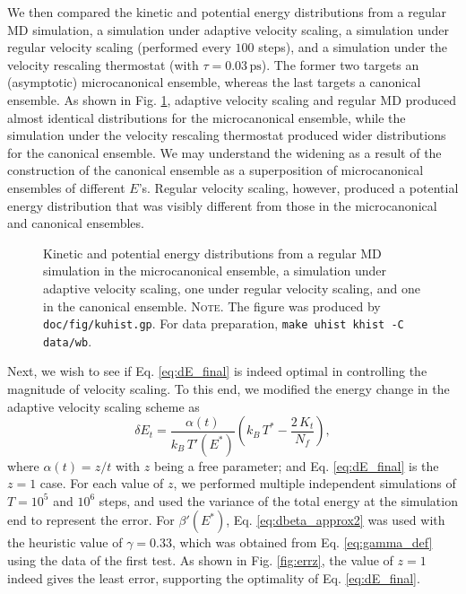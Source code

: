 \documentclass[reprint]{revtex4-1}
\newcommand{\note}[1]{{\color{DarkGreen}\footnotesize \textsc{Note.} #1}}
\begin{document}
We then compared the kinetic and potential energy
distributions from a regular MD simulation,
a simulation under adaptive velocity scaling,
a simulation under regular velocity scaling (performed every $100$ steps),
and
a simulation under the velocity rescaling
thermostat\cite{bussi2007}
(with $\tau = 0.03 \, \mathrm{ps}$).
%
The former two targets an (asymptotic) microcanonical ensemble,
whereas the last targets a canonical ensemble.
%
As shown in Fig. \ref{fig:kuhist},
adaptive velocity scaling and regular MD
produced almost identical distributions for the microcanonical ensemble,
while the simulation under the velocity rescaling thermostat
produced wider distributions for the canonical ensemble.
%
We may understand the widening %
as a result of the construction of the canonical ensemble
as a superposition of microcanonical ensembles of different $E$'s.
%
Regular velocity scaling, however, produced
a potential energy distribution that
was visibly different from
those in the microcanonical and canonical ensembles.
%

\begin{figure}[h]
\begin{center}
  \caption{
    \label{fig:kuhist}
    Kinetic and potential energy distributions
    from a regular MD simulation in the microcanonical ensemble,
    a simulation under adaptive velocity scaling,
    one under regular velocity scaling,
    and one in the canonical ensemble.
    \note{The figure was produced by \texttt{doc/fig/kuhist.gp}.
      For data preparation, \texttt{make uhist khist -C data/wb}.
    }%
  }
\end{center}
\end{figure}


Next, we wish to see if Eq. \eqref{eq:dE_final}
is indeed optimal in controlling the magnitude of velocity scaling.
%
To this end, we modified the energy change in
the adaptive velocity scaling scheme as
%
\begin{equation}
  \delta E_t
  =
  \frac{ \alpha(t) } { k_B \, T'(E^*) }
  \left(
   k_B \, T^* -
   \frac{ 2 \, K_t } { N_f }
  \right)
  ,
  \label{eq:dE_mod}
\end{equation}
%
where $\alpha(t) = z/t$ with $z$ being a free parameter;
and Eq. \eqref{eq:dE_final} is the $z = 1$ case.
%
For each value of $z$,
we performed multiple independent simulations of
$T = 10^5$ and $10^6$ steps,
and used the variance of the total energy at the simulation end
to represent the error.
%
For $\beta'(E^*)$,
Eq. \eqref{eq:dbeta_approx2} was used with the heuristic value of
$\gamma = 0.33$,
which was obtained from Eq. \eqref{eq:gamma_def}
using the data of the first test.
%
As shown in Fig. \ref{fig:errz},
the value of $z = 1$
indeed gives the least error,
supporting the optimality of Eq. \eqref{eq:dE_final}.
\end{document}
